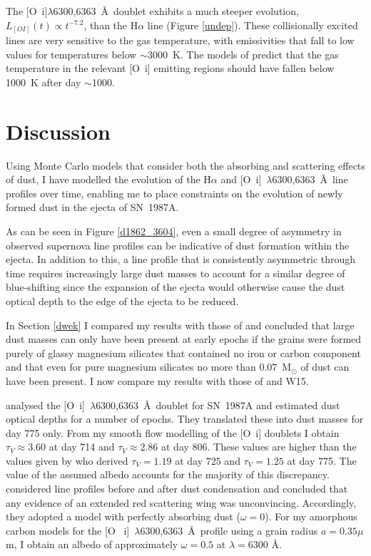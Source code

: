 The [O~{\sc i}]$\lambda$6300,6363~\AA\ doublet exhibits a much 
steeper evolution, $L_{[OI]}(t) \propto t^{-7.2}$, than the H$\alpha$ line 
(Figure \ref{undep}). These collisionally excited lines are very sensitive 
to the gas temperature, with emissivities that fall to low values for 
temperatures below $\sim$3000~K. The models of \citet{Li1992,Kozma1998a} 
predict that the gas temperature in the relevant [O~{\sc i}] emitting 
regions should have fallen below 1000~K after day $\sim$1000.





\section{Discussion}
\label{discuss}

Using Monte Carlo models that consider both the absorbing and scattering 
effects of dust, I have modelled the evolution of the H$\alpha$ and 
[O~{\sc i}]~$\lambda$6300,6363~\AA\ line profiles over time, enabling me 
to place constraints on the evolution of newly formed dust in the ejecta 
of SN~1987A.

As can be seen in Figure \ref{d1862_3604}, even a small degree of 
asymmetry in observed supernova line profiles can be indicative of dust 
formation within the ejecta.  In addition to this, a line profile that is 
consistently asymmetric through time requires increasingly large dust 
masses to account for a similar degree of blue-shifting since the 
expansion of the ejecta would otherwise cause the dust optical depth to 
the edge of the ejecta to be reduced.

In Section \ref{dwek} I compared my results with those of \citet{Dwek2015} and 
concluded that large dust masses can only have been present at early 
epochs if the grains were formed purely of glassy magnesium silicates that 
contained no iron or carbon component and that even for pure magnesium 
silicates no more than 0.07~M$_\odot$ of dust can have been present. I now 
compare my results with those of \citet{Lucy1989} and W15.

\citet{Lucy1989} analysed the [O~{\sc i}]~$\lambda$6300,6363~\AA\ doublet 
for SN~1987A and estimated dust optical depths for a number of epochs. 
They translated these into dust masses for day 775 only. From my smooth 
flow modelling of the [O~{\sc i}] doublets I obtain $\tau_V \approx 3.60$ at day 
714 and $\tau_V \approx 2.86$ at day 806.  These values are higher 
than the values given by \citet{Lucy1989} who derived $\tau_V=1.19$ at day 
725 and $\tau_V=1.25$ at day 775.  The value of the assumed albedo 
accounts for the majority of this discrepancy.  \citet{Lucy1989} 
considered line profiles before and after dust condensation and concluded 
that any evidence of an extended red scattering wing was unconvincing.  
Accordingly, they adopted a model with perfectly absorbing dust ($\omega = 
0$).  For my amorphous carbon models for the [O~{\sc 
i}]~$\lambda$6300,6363~\AA\ profile using a grain radius $a=0.35\mu$m, I 
obtain an albedo of approximately $\omega = 0.5$ at $\lambda=6300$ \AA.


